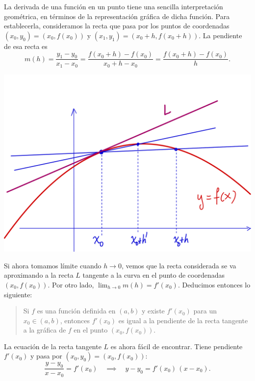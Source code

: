 La derivada de una función en un punto tiene una sencilla interpretación geométrica, en términos de la representación gráfica de dicha función. Para establecerla, consideramos la recta que pasa por los puntos de coordenadas $(x_0,y_0)=(x_0,f(x_0))$ y $(x_1,y_1)=(x_0+h,f(x_0+h))$. La pendiente de esa recta es
\[
m(h) = \frac{y_1-y_0}{x_1-x_0}
= \frac{f(x_0+h)-f(x_0)}{x_0+h-x_0}
= \frac{f(x_0+h)-f(x_0)}{h}.
\]

\centerline{\includegraphics[width=.8\textwidth]{pics/tangente.png}}

Si ahora tomamos límite cuando $h\to 0$, vemos que la recta considerada se va aproximando a la recta $L$ tangente a la curva en el punto de coordenadas $(x_0,f(x_0))$. Por otro lado, $\lim_{h\to 0}m(h)=f'(x_0)$. Deducimos entonces lo siguiente:
\begin{quote}
    Si $f$ es una función definida en $(a,b)$ y existe $f'(x_0)$ para un $x_0\in(a,b)$, entonces $f'(x_0)$ es igual a la pendiente de la recta tangente a la gráfica de $f$ en el punto $(x_0,f(x_0))$.
\end{quote}

La ecuación de la recta tangente $L$ es ahora fácil de encontrar. Tiene pendiente $f'(x_0)$ y pasa por $(x_0,y_0)=(x_0,f(x_0))$:
\[
\frac{y-y_0}{x-x_0} = f'(x_0)
\quad\implies\quad
y - y_0 = f'(x_0)\, (x-x_0).
\]

